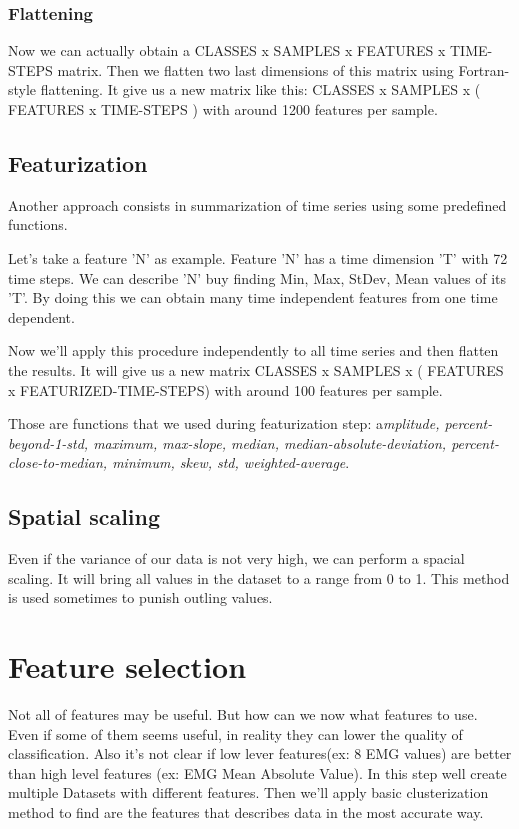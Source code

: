 \documentclass[conference,compsoc]{IEEEtran}
\begin{document}
\subsubsection{Flattening}

Now we can actually obtain a CLASSES x SAMPLES x FEATURES x TIME-STEPS matrix. Then we flatten two last dimensions of this matrix using Fortran-style flattening. It give us a new matrix like this: CLASSES x SAMPLES x ( FEATURES x TIME-STEPS ) with around 1200 features per sample.
\subsection{Featurization}
Another approach consists in summarization of time series using some predefined functions. 

Let's take a feature 'N' as example. Feature 'N' has a time dimension 'T' with 72 time steps. We can describe 'N' buy finding Min, Max, StDev, Mean values of its 'T'. By doing this we can obtain many time independent features from one time dependent.

Now we'll apply this procedure independently to all time series and then flatten the results. It will give us a new matrix CLASSES x SAMPLES x ( FEATURES x FEATURIZED-TIME-STEPS) with around 100 features per sample. 

Those are functions that we used during featurization step: a\textit{mplitude, percent-beyond-1-std, maximum, max-slope, median, median-absolute-deviation, percent-close-to-median, minimum, skew, std, weighted-average}.

\subsection{Spatial scaling}
Even if the variance of our data is not very high, we can perform a spacial scaling. It will bring all values in the dataset to a range from 0 to 1. This method is used sometimes to punish outling values. 

\section{Feature selection}
Not all of features may be useful. But how can we now what features to use. Even if some of them seems useful, in reality they can lower the quality of classification. Also it's not clear if low lever features(ex: 8 EMG values) are better than high level features (ex: EMG Mean Absolute Value). In this step well create multiple Datasets with different features. Then we'll apply basic clusterization method to find are the features that describes data in the most accurate way. 
\end{document}

